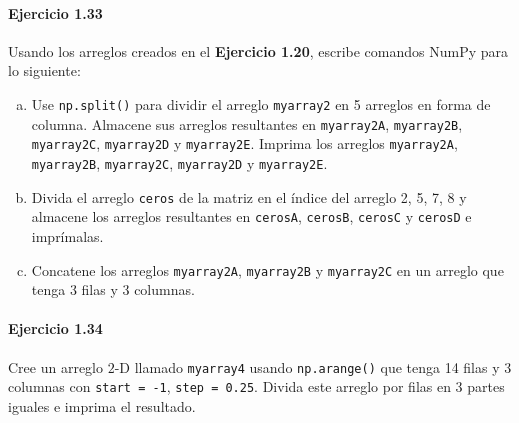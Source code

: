 \paragraph{\color{DarkBlue}Ejercicio 1.33}
Usando los arreglos creados en el \textbf{Ejercicio 1.20},
escribe comandos NumPy para lo siguiente:

\begin{enumerate}[(a)]
	\item

	      Use \texttt{np.split()} para dividir el arreglo
	      \texttt{myarray2} en 5 arreglos en forma de
	      columna.
	      Almacene sus arreglos resultantes en
	      \texttt{myarray2A},
	      \texttt{myarray2B},
	      \texttt{myarray2C},
	      \texttt{myarray2D} y
	      \texttt{myarray2E}.
	      Imprima los arreglos \texttt{myarray2A},
	      \texttt{myarray2B},
	      \texttt{myarray2C},
	      \texttt{myarray2D} y
	      \texttt{myarray2E}.

	\item

	      Divida el arreglo \texttt{ceros} de la matriz
	      en el índice del arreglo 2, 5, 7, 8 y almacene los arreglos
	      resultantes en \texttt{cerosA},
	      \texttt{cerosB}, \texttt{cerosC} y
	      \texttt{cerosD} e imprímalas.

	\item

	      Concatene los arreglos \texttt{myarray2A},
	      \texttt{myarray2B} y
	      \texttt{myarray2C} en un arreglo que tenga 3
	      filas y 3 columnas.
\end{enumerate}

\paragraph{\color{DarkBlue}Ejercicio 1.34}

Cree un arreglo $2$-D llamado \texttt{myarray4} usando
\texttt{np.arange()} que tenga 14 filas y 3 columnas con
\texttt{start = -1}, \texttt{step = 0.25}.
Divida este arreglo por filas en 3 partes iguales e imprima el
resultado.

